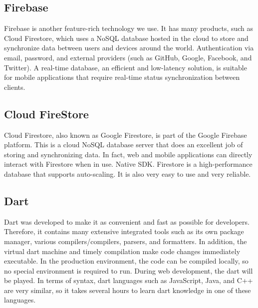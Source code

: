 \subsection{Firebase}
Firebase is another feature-rich technology we use. It has many products, such as Cloud Firestore, which uses a NoSQL database hosted in the cloud to store and synchronize data between users and devices around the world. Authentication via email, password, and external providers (such as GitHub, Google, Facebook, and Twitter). A real-time database, an efficient and low-latency solution, is suitable for mobile applications that require real-time status synchronization between clients. 
\subsection{Cloud FireStore}
Cloud Firestore, also known as Google Firestore, is part of the Google Firebase platform. This is a cloud NoSQL database server that does an excellent job of storing and synchronizing data. In fact, web and mobile applications can directly interact with Firestore when in use. Native SDK. Firestore is a high-performance database that supports auto-scaling. It is also very easy to use and very reliable.

\subsection{Dart}
Dart was developed to make it as convenient and fast as possible for developers. Therefore, it contains many extensive integrated tools such as its own package manager, various compilers/compilers, parsers, and formatters. In addition, the virtual dart machine and timely compilation make code changes immediately executable. In the production environment, the code can be compiled locally, so no special environment is required to run. During web development, the dart will be played. In terms of syntax, dart languages such as JavaScript, Java, and C++ are very similar, so it takes several hours to learn dart knowledge in one of these languages.

